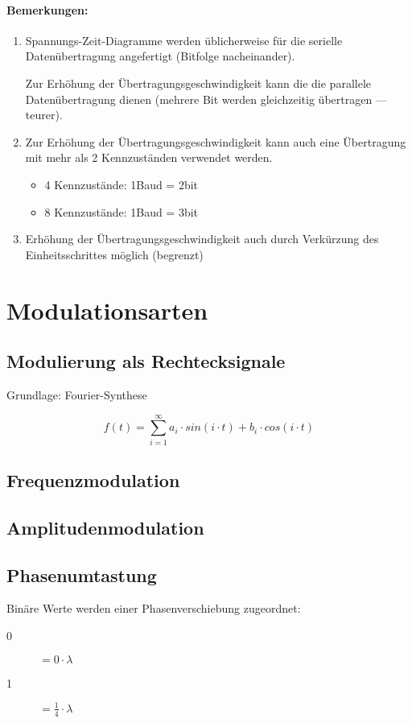 \paragraph{Bemerkungen:}
\begin{enumerate}
\item Spannungs-Zeit-Diagramme werden üblicherweise für die serielle Datenübertragung angefertigt (Bitfolge nacheinander).

Zur Erhöhung der Übertragungsgeschwindigkeit kann die die parallele Datenübertragung dienen (mehrere Bit werden gleichzeitig übertragen — teurer).
\item Zur Erhöhung der Übertragungsgeschwindigkeit kann auch eine Übertragung mit mehr als 2 Kennzuständen verwendet werden. 
\begin{itemize}
\item 4 Kennzustände: 1Baud = 2bit
\item 8 Kennzustände: 1Baud = 3bit
\end{itemize}
\item Erhöhung der Übertragungsgeschwindigkeit auch durch Verkürzung des Einheitsschrittes möglich (begrenzt)
\end{enumerate}

\section{Modulationsarten}

\subsection{Modulierung als Rechtecksignale}
Grundlage: Fourier-Synthese

$$ f(t) = \sum\limits_{i=1}^\infty a_i \cdot sin(i \cdot t) + b_i \cdot cos(i \cdot t) $$


\subsection{Frequenzmodulation}

\subsection{Amplitudenmodulation}

\subsection{Phasenumtastung}

Binäre Werte werden einer Phasenverschiebung zugeordnet:
\begin{description}
\item[0] $= 0 \cdot \lambda $
\item[1] $= \frac{1}{4} \cdot \lambda $
\end{description}

